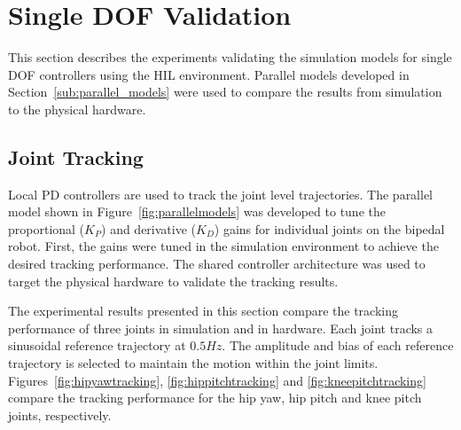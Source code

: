 

\section{Single DOF Validation} %
\label{sec:1dof_validation}
This section describes the experiments validating the simulation models for single DOF controllers using the HIL environment. Parallel models developed in Section~\ref{sub:parallel_models} were used to compare the results from simulation to the physical hardware. 

\subsection{Joint Tracking} %
\label{sub:joint_tracking}
Local PD controllers are used to track the joint level trajectories. The parallel model shown in Figure~\ref{fig:parallelmodels} was developed to tune the proportional ($K_P$) and derivative ($K_D$) gains for individual joints on the bipedal robot. First, the gains were tuned in the simulation environment to achieve the desired tracking performance. The shared controller architecture was used to target the physical hardware to validate the tracking results. 

The experimental results presented in this section compare the tracking performance of three joints in simulation and in hardware. Each joint tracks a sinusoidal reference trajectory at $0.5 Hz$. The amplitude and bias of each reference trajectory is selected to maintain the motion within the joint limits. Figures~\ref{fig:hipyawtracking}, \ref{fig:hippitchtracking} and \ref{fig:kneepitchtracking} compare the tracking performance for the hip yaw, hip pitch and knee pitch joints, respectively. 

